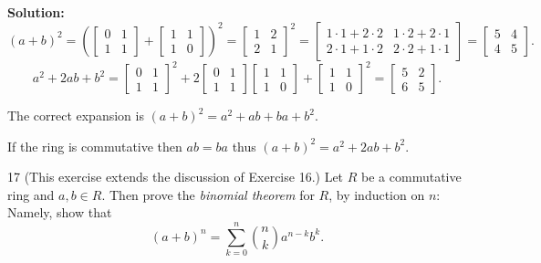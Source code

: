 \textbf{Solution:}
\[
    (a + b)^2 =
    \left(\begin{bmatrix}
    0 & 1 \\
    1 & 1
    \end{bmatrix}
    +
    \begin{bmatrix}
    1 & 1 \\
    1 & 0
    \end{bmatrix}\right)^2
    =
    \begin{bmatrix}
    1 & 2 \\
    2 & 1
    \end{bmatrix}^2
    =
    \begin{bmatrix}
    1\cdot1 + 2\cdot2 & 1\cdot2 + 2\cdot1 \\
    2\cdot1 + 1\cdot2 & 2\cdot2 + 1\cdot1
    \end{bmatrix}
    =
    \begin{bmatrix}
    5 & 4 \\
    4 & 5
    \end{bmatrix}.
\]
\[
    a^2 + 2ab + b^2
    =
    \begin{bmatrix}
    0 & 1 \\
    1 & 1
    \end{bmatrix}^2
    + 2
    \begin{bmatrix}
    0 & 1 \\
    1 & 1
    \end{bmatrix}
    \begin{bmatrix}
    1 & 1 \\
    1 & 0
    \end{bmatrix}
    +
    \begin{bmatrix}
    1 & 1 \\
    1 & 0
    \end{bmatrix}^2
    =
    \begin{bmatrix}
    5 & 2 \\
    6 & 5
    \end{bmatrix}.
\]

The correct expansion is 
    $(a + b)^2 = a^2 + ab + ba + b^2$.

If the ring is commutative then $ab = ba$
    thus $(a + b)^2 = a^2 + 2ab + b^2$.

\begin{problem}{17}
    (This exercise extends the discussion of Exercise 16.)
    Let $R$ be a commutative ring and $a, b \in R$.
    Then prove the \emph{binomial theorem}
    for $R$, by induction on $n$: Namely, show that 
    \[(a + b)^n = \sum_{k = 0}^{n} \binom{n}{k} a^{n - k}b^k.\]
\end{problem}
\solved

